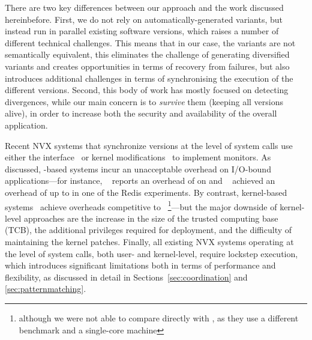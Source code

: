 
There are two key differences between our approach and the work discussed
hereinbefore.  First, we do not rely on automatically-generated variants, but
instead run in parallel existing software versions, which raises a number of
different technical challenges.  This means that in our case, the variants are
not semantically equivalent, this eliminates the challenge of generating
diversified variants and creates opportunities in terms of recovery from
failures, but also introduces additional challenges in terms of synchronising
the execution of the different versions.  Second, this body of work has mostly
focused on detecting divergences, while our main concern is to \textit{survive}
them (keeping all versions alive), in order to increase both the security and
availability of the overall application.


Recent NVX systems that synchronize versions at the level of system
calls use either the \ptrace interface~\cite{orchestra09,tachyon12,mx}
or kernel modifications~\cite{cox2006} to implement monitors.  As
discussed, -based systems incur an unacceptable overhead
on I/O-bound applications---for instance, \tachyon~\cite{tachyon12}
reports an overhead of \tachyonLighttpd on \lighttpd and \mx~\cite{mx}
achieved an overhead of up to \mxRedis in one of the Redis
experiments.  By contrast, kernel-based systems~\cite{cox2006} achieve
overheads competitive to \varan~\footnote{although we were not able to compare
directly with \cite{cox2006}, as they use a different benchmark and a
single-core machine}---but the major downside of kernel-level approaches are
the increase in the size of the trusted computing base (TCB), the additional
privileges required for deployment, and the difficulty of maintaining the
kernel patches.  Finally, all existing NVX systems operating at the level of
system calls, both user- and kernel-level, require lockstep execution, which
introduces significant limitations both in terms of performance and
flexibility, as discussed in detail in Sections~\ref{sec:coordination} and
\ref{sec:patternmatching}.

